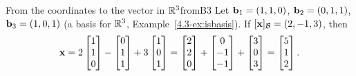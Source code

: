 \documentclass[11pt]{article}
\begin{document}
\begin{exmp}{From the coordinates to the vector in $\mathbb{R}^3$}{fromB3}
Let $\mathbf{b}_1=(1,1,0)$, $\mathbf{b}_2=(0,1,1)$, $\mathbf{b}_3=(1,0,1)$ (a basis for $\mathbb{R}^3$, Example~\ref{4.3-ex:isbasis}). If $[\mathbf{x}]_{\mathcal{B}}=(2,-1,3)$, then
\[
\mathbf{x}=2\begin{bmatrix}1\\1\\0\end{bmatrix}-\begin{bmatrix}0\\1\\1\end{bmatrix}+3\begin{bmatrix}1\\0\\1\end{bmatrix}=\begin{bmatrix}2\\2\\0\end{bmatrix}+\begin{bmatrix}0\\-1\\-1\end{bmatrix}+\begin{bmatrix}3\\0\\3\end{bmatrix}=\begin{bmatrix}5\\1\\2\end{bmatrix}.
\]
\end{exmp}
\end{document}
